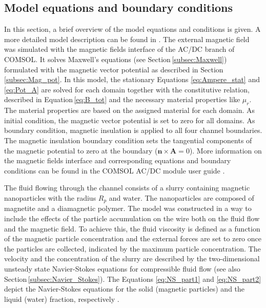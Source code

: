 \subsection{Model equations and boundary conditions}
\label{subsec:model_eq_BC}
In this section, a brief overview of the model equations and conditions is given. A more detailed model description can be found in \cite{choomphon2017simulation}. The external magnetic field was simulated with the magnetic fields interface of the AC/DC branch of COMSOL. It solves Maxwell's equations (see Section\,\ref{subsec:Maxwell}) formulated with the magnetic vector potential as described in Section\,\ref{subsec:Mag_pot}. In this model, the stationary Equations \ref{eq:Ampere_stat} and \ref{eq:Pot_A} are solved for each domain together with the constitutive relation, described in Equation\,\ref{eq:B_tot} and the necessary material properties like $\mu_{r}$. The material properties are based on the assigned material for each domain. As initial condition, the magnetic vector potential is set to zero for all domains.  As boundary condition, magnetic insulation is applied to all four channel boundaries. The magnetic insulation boundary condition sets the tangential components of the magnetic potential to zero at the boundary ($\boldsymbol{n}\times\boldsymbol{A} = 0$). More information on the magnetic fields interface and corresponding equations and boundary conditions can be found in the COMSOL AC/DC module user guide \cite{ComsolACDC}. 

The fluid flowing through the channel consists of a slurry containing magnetic nanoparticles with the radius $R_{p}$ and water. The nanoparticles are composed of magnetite and a diamagnetic polymer. The model was constructed in a way to include the effects of the particle accumulation on the wire both on the fluid flow and the magnetic field. To achieve this, the fluid viscosity is defined as a function of the magnetic particle concentration and the external forces are set to zero once the particles are collected, indicated by the maximum particle concentration. The velocity and the concentration of the slurry are described by the two-dimensional unsteady state Navier-Stokes equations for compressible fluid flow (see also Section\,\ref{subsec:Navier_Stokes}). The Equations \ref{eq:NS_part1} and \ref{eq:NS_part2} depict the Navier-Stokes equations for the solid (magnetic particles) and the liquid (water) fraction, respectively \cite{choomphon2017simulation}. 

